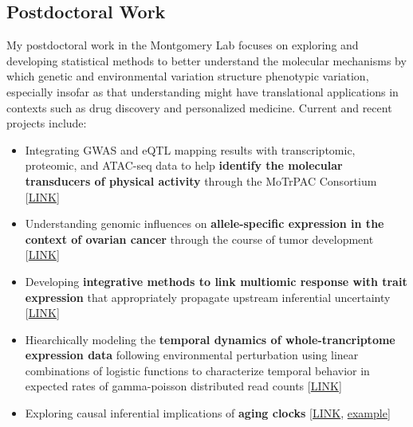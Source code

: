 \documentclass[12pt]{article}
\begin{document}
\subsection{Postdoctoral Work}

My postdoctoral work in the Montgomery Lab focuses on exploring and developing statistical methods to better understand the molecular mechanisms by which genetic and environmental variation structure phenotypic variation, especially insofar as that understanding might have translational applications in contexts such as drug discovery and personalized medicine.  Current and recent projects include:

\begin{itemize}[noitemsep]

\item Integrating GWAS and eQTL mapping results with transcriptomic, proteomic, and ATAC-seq data to help \textbf{identify the molecular transducers of physical activity} through the MoTrPAC Consortium [\href{https://github.com/NikVetr/MoTrPAC\_Complex\_Traits}{LINK}]

\item Understanding genomic influences on \textbf{allele-specific expression in the context of ovarian cancer} through the course of tumor development [\href{https://github.com/nsabell/egtex-ase}{LINK}]

\item Developing \textbf{integrative methods to link multiomic response with trait expression} that appropriately propagate upstream inferential uncertainty [\href{https://github.com/NikVetr/papers/blob/main/twas-method/proposed\_TWAS\_method.pdf}{LINK}]

\item Hiearchically modeling the \textbf{temporal dynamics of whole-trancriptome expression data} following environmental perturbation using linear combinations of logistic functions to characterize temporal behavior in expected rates of gamma-poisson distributed read counts [\href{https://github.com/NikVetr/montgomery_lab/blob/61e2ac4b0fea0ee7f5bf31590a40378f0027264a/growth\_and\_decay\_processes.R#L8}{LINK}]

\item Exploring causal inferential implications of \textbf{aging clocks} [\href{https://github.com/NikVetr/montgomery\_lab/blob/61e2ac4b0fea0ee7f5bf31590a40378f0027264a/collider\_effects\_on\_R2.R#L4}{LINK}, \href{https://drive.google.com/file/d/1AQU0YMVoYCEFuIICHGIXGxoXm6dj7HxY/view}{example}]


\end{itemize}
\end{document}
